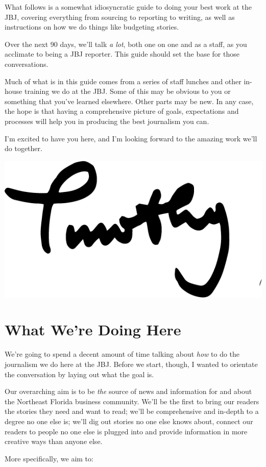 \documentclass[
  11pt,
  american,
  letterpaperpaper,
  extrafontsizes,onecolumn,openright
  ]{memoir}
\begin{document}
What follows is a somewhat idiosyncratic guide to doing your best work at the JBJ, covering everything from sourcing to reporting to writing, as well as instructions on how we do things like budgeting stories.

Over the next 90 days, we'll talk \emph{a lot}, both one on one and as a staff, as you acclimate to being a JBJ reporter. This guide should set the base for those conversations.

Much of what is in this guide comes from a series of staff lunches and other in-house training we do at the JBJ. Some of this may be obvious to you or something that you've learned elsewhere. Other parts may be new. In any case, the hope is that having a comprehensive picture of goals, expectations and processes will help you in producing the best journalism you can.

I'm excited to have you here, and I'm looking forward to the amazing work we'll do together.

\scriptsize

\begin{flushright}\includegraphics[width=0.2\linewidth]{images/signature} \end{flushright}

\normalsize

\hypertarget{what-were-doing-here}{%
\chapter{What We're Doing Here}\label{what-were-doing-here}}

We're going to spend a decent amount of time talking about \emph{how} to do the journalism we do here at the JBJ. Before we start, though, I wanted to orientate the conversation by laying out what the goal is.

Our overarching aim is to be \emph{the} source of news and information for and about the Northeast Florida business community. We'll be the first to bring our readers the stories they need and want to read; we'll be comprehensive and in-depth to a degree no one else is; we'll dig out stories no one else knows about, connect our readers to people no one else is plugged into and provide information in more creative ways than anyone else.

More specifically, we aim to:
\end{document}
